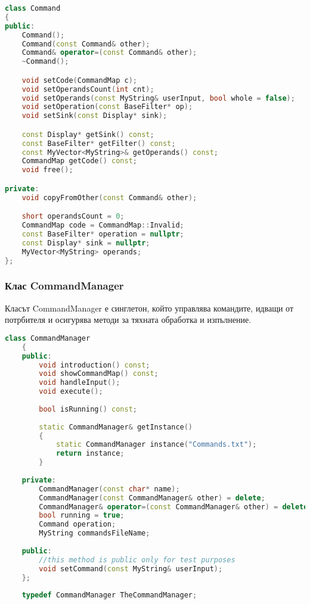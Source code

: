 \documentclass[a4paper,12pt]{article}
\begin{document}
\begin{lstlisting}[language=C++]
class Command
{
public:
    Command();
    Command(const Command& other);
    Command& operator=(const Command& other);
    ~Command();

    void setCode(CommandMap c);
    void setOperandsCount(int cnt);
    void setOperands(const MyString& userInput, bool whole = false);
    void setOperation(const BaseFilter* op);
    void setSink(const Display* sink);

    const Display* getSink() const;
    const BaseFilter* getFilter() const;
    const MyVector<MyString>& getOperands() const;
    CommandMap getCode() const;
    void free();

private:
    void copyFromOther(const Command& other);

    short operandsCount = 0;
    CommandMap code = CommandMap::Invalid;
    const BaseFilter* operation = nullptr;
    const Display* sink = nullptr;
    MyVector<MyString> operands;
};
\end{lstlisting}


\subsubsection{Клас CommandManager}
Класът CommandManager е синглетон, който управлява командите, идващи от потрбителя и осигурява методи за тяхната обработка и изпълнение.

\begin{lstlisting}[language=C++]
    class CommandManager
    {
    public:
        void introduction() const;
        void showCommandMap() const;
        void handleInput();
        void execute();
    
        bool isRunning() const;
    
        static CommandManager& getInstance()
        {
            static CommandManager instance("Commands.txt");
            return instance;
        }
    
    private:
        CommandManager(const char* name);
        CommandManager(const CommandManager& other) = delete;
        CommandManager& operator=(const CommandManager& other) = delete;
        bool running = true;
        Command operation;
        MyString commandsFileName;
    
    public:
        //this method is public only for test purposes
        void setCommand(const MyString& userInput);
    };
    
    typedef CommandManager TheCommandManager;
\end{lstlisting}
\end{document}
